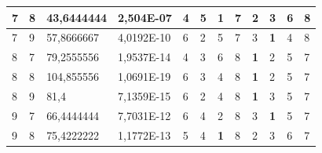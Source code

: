 \documentclass[conference]{IEEEtran}
\begin{document}
\begin{table}[]
\begin{tabular}{|llll|llllllll|}
		\multicolumn{1}{|l|}{7}   & \multicolumn{1}{l|}{8}         & \multicolumn{1}{l|}{43,6444444}    & 2,504E-07  & \multicolumn{1}{l|}{4}          & \multicolumn{1}{l|}{5}          & \multicolumn{1}{l|}{\textbf{1}} & \multicolumn{1}{l|}{7}   & \multicolumn{1}{l|}{2}          & \multicolumn{1}{l|}{3}          & \multicolumn{1}{l|}{6}   & 8                      \\ \hline
		\multicolumn{1}{|l|}{7}   & \multicolumn{1}{l|}{9}         & \multicolumn{1}{l|}{57,8666667}    & 4,0192E-10 & \multicolumn{1}{l|}{6}          & \multicolumn{1}{l|}{2}          & \multicolumn{1}{l|}{5}          & \multicolumn{1}{l|}{7}   & \multicolumn{1}{l|}{3}          & \multicolumn{1}{l|}{\textbf{1}} & \multicolumn{1}{l|}{4}   & 8                      \\ \hline
		\multicolumn{1}{|l|}{8}   & \multicolumn{1}{l|}{7}         & \multicolumn{1}{l|}{79,2555556}    & 1,9537E-14 & \multicolumn{1}{l|}{4}          & \multicolumn{1}{l|}{3}          & \multicolumn{1}{l|}{6}          & \multicolumn{1}{l|}{8}   & \multicolumn{1}{l|}{\textbf{1}} & \multicolumn{1}{l|}{2}          & \multicolumn{1}{l|}{5}   & 7                      \\ \hline
		\multicolumn{1}{|l|}{8}   & \multicolumn{1}{l|}{8}         & \multicolumn{1}{l|}{104,855556}    & 1,0691E-19 & \multicolumn{1}{l|}{6}          & \multicolumn{1}{l|}{3}          & \multicolumn{1}{l|}{4}          & \multicolumn{1}{l|}{8}   & \multicolumn{1}{l|}{\textbf{1}} & \multicolumn{1}{l|}{2}          & \multicolumn{1}{l|}{5}   & 7                      \\ \hline
		\multicolumn{1}{|l|}{8}   & \multicolumn{1}{l|}{9}         & \multicolumn{1}{l|}{81,4}          & 7,1359E-15 & \multicolumn{1}{l|}{6}          & \multicolumn{1}{l|}{2}          & \multicolumn{1}{l|}{4}          & \multicolumn{1}{l|}{8}   & \multicolumn{1}{l|}{\textbf{1}} & \multicolumn{1}{l|}{3}          & \multicolumn{1}{l|}{5}   & 7                      \\ \hline
		\multicolumn{1}{|l|}{9}   & \multicolumn{1}{l|}{7}         & \multicolumn{1}{l|}{66,4444444}    & 7,7031E-12 & \multicolumn{1}{l|}{6}          & \multicolumn{1}{l|}{4}          & \multicolumn{1}{l|}{2}          & \multicolumn{1}{l|}{8}   & \multicolumn{1}{l|}{3}          & \multicolumn{1}{l|}{\textbf{1}} & \multicolumn{1}{l|}{5}   & 7                      \\ \hline
		\multicolumn{1}{|l|}{9}   & \multicolumn{1}{l|}{8}         & \multicolumn{1}{l|}{75,4222222}    & 1,1772E-13 & \multicolumn{1}{l|}{5}          & \multicolumn{1}{l|}{4}          & \multicolumn{1}{l|}{\textbf{1}} & \multicolumn{1}{l|}{8}   & \multicolumn{1}{l|}{2}          & \multicolumn{1}{l|}{3}          & \multicolumn{1}{l|}{6}   & 7                      \\ \hline

\end{tabular}
\end{table}
\end{document}
